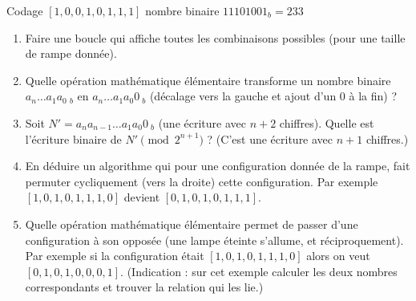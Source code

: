 \begin{frame}


\pause

\vspace*{-2ex}
\centerline{Codage  $[1,0,0,1,0,1,1,1]$ \pause  nombre binaire $11101001_b = 233$}

\pause

\footnotesize
\begin{tp}

\begin{enumerate}
\setlength{\itemsep}{0pt}
  \item Faire une boucle qui affiche toutes les combinaisons possibles (pour une taille de rampe donnée).
  
  \item Quelle opération mathématique élémentaire transforme un nombre binaire 
 $a_n \ldots a_1 a_0 \ _b$ en $a_n \ldots a_1 a_0 0\ _b$ (décalage vers la gauche et ajout d'un $0$ à la fin) ?

 \item Soit $N' = a_n a_{n-1} \ldots a_1 a_0 0 \ _b$ (une écriture avec $n+2$ chiffres). 
 Quelle est l'écriture binaire de $N' \pmod {2^{n+1}}$ ? (C'est une écriture avec $n+1$ chiffres.)
 
 \item En déduire un algorithme qui pour une configuration donnée de la rampe, fait permuter cycliquement 
 (vers la droite) cette configuration. Par exemple $[1,0,1,0,1,1,1,0]$ devient $[0,1,0,1,0,1,1,1]$.
 
 \item Quelle opération mathématique élémentaire permet de passer d'une configuration à son opposée (une lampe éteinte s'allume,
 et réciproquement). Par exemple si la configuration était $[1,0,1,0,1,1,1,0]$ alors on veut $[0,1,0,1,0,0,0,1]$.
 (Indication : sur cet exemple calculer les deux nombres correspondants et trouver la relation qui les lie.)
\end{enumerate}
\end{tp}  
\end{frame}



